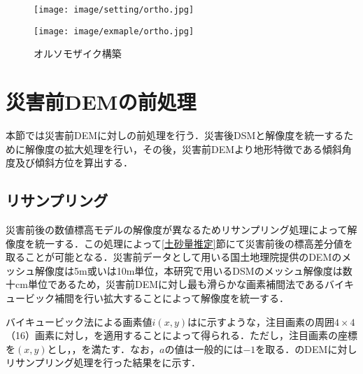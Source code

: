       \begin{figure}[t]
        \begin{minipage}[c]{0.45\hsize}
          \centering
          \texttt{[image: image/setting/ortho.jpg]}
          \label{オルソモザイク構築設定値}
        \end{minipage}
        \begin{minipage}[c]{0.45\hsize}
          \centering
          \texttt{[image: image/exmaple/ortho.jpg]}
          \label{オルソモザイク構築結果}
        \end{minipage}
        \caption{オルソモザイク構築}
      \end{figure}



  \section{災害前DEMの前処理}
    \label{災害前DEMの前処理}
    本節では災害前DEMに対しの前処理を行う．災害後DSMと解像度を統一するために解像度の拡大処理を行い，その後，災害前DEMより地形特徴である傾斜角度及び傾斜方位を算出する．


    \subsection{リサンプリング}
      \label{リサンプリング}
      災害前後の数値標高モデルの解像度が異なるためリサンプリング処理によって解像度を統一する．この処理によって\ref{土砂量推定}節にて災害前後の標高差分値を取ることが可能となる．災害前データとして用いる国土地理院提供のDEMのメッシュ解像度は5m或いは10m単位，本研究で用いるDSMのメッシュ解像度は数十cm単位であるため，災害前DEMに対し最も滑らかな画素補間法であるバイキュービック補間\cite{バイキュービック法}を行い拡大することによって解像度を統一する．
      
      バイキュービック法による画素値$i(x,y)$はに示すような，注目画素の周囲$4\times4$（16）画素に対し，を適用することによって得られる．ただし，注目画素の座標を$(x,y)$とし，，を満たす．なお，$a$の値は一般的には$-1$を取る．のDEMに対しリサンプリング処理を行った結果をに示す．

